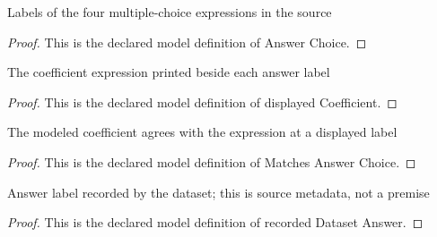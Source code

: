 \begin{definition}
  \label{def:physics:phyx-mini-0544:phyxminiproblems-problemphyxmini0544-answerchoice}
  Labels of the four multiple-choice expressions in the source
\end{definition}
\begin{proof}
  This is the declared model definition of Answer Choice.
\end{proof}
\begin{definition}
  \label{def:physics:phyx-mini-0544:phyxminiproblems-problemphyxmini0544-displayedcoefficient}
  The coefficient expression printed beside each answer label
\end{definition}
\begin{proof}
  This is the declared model definition of displayed Coefficient.
\end{proof}
\begin{definition}
  \label{def:physics:phyx-mini-0544:phyxminiproblems-problemphyxmini0544-matchesanswerchoice}
  The modeled coefficient agrees with the expression at a displayed label
\end{definition}
\begin{proof}
  This is the declared model definition of Matches Answer Choice.
\end{proof}
\begin{definition}
  \label{def:physics:phyx-mini-0544:phyxminiproblems-problemphyxmini0544-recordeddatasetanswer}
  Answer label recorded by the dataset; this is source metadata, not a premise
\end{definition}
\begin{proof}
  This is the declared model definition of recorded Dataset Answer.
\end{proof}
